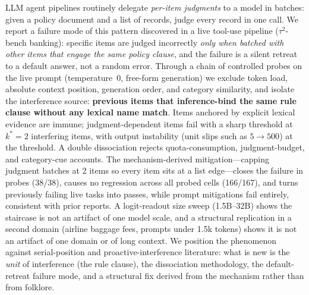 LLM agent pipelines routinely delegate \emph{per-item judgments} to a model in batches: given a policy document
and a list of records, judge every record in one call. We report a failure mode of this pattern discovered in a
live tool-use pipeline ($\tau^2$-bench banking): specific items are judged incorrectly \emph{only when batched
with other items that engage the same policy clause}, and the failure is a silent retreat to a default answer,
not a random error. Through a chain of controlled probes on the live prompt (temperature~0, free-form
generation) we exclude token load, absolute context position, generation order, and category similarity, and
isolate the interference source: \textbf{previous items that inference-bind the same rule clause without any
lexical name match}. Items anchored by explicit lexical evidence are immune; judgment-dependent items fail with
a sharp threshold at $k^\ast{=}2$ interfering items, with output instability (unit slips such as
$5 \rightarrow 500$) at the threshold. A double dissociation rejects quota-consumption, judgment-budget, and
category-cue accounts. The mechanism-derived mitigation---capping judgment batches at 2 items so every item
sits at a list edge---closes the failure in probes (38/38), causes no regression across all probed cells
(166/167), and turns previously failing live tasks into passes, while prompt mitigations fail entirely,
consistent with prior reports. A logit-readout size sweep (1.5B--32B) shows the staircase is not an artifact of
one model scale, and a structural replication in a second domain (airline baggage fees, prompts under 1.5k
tokens) shows it is not an artifact of one domain or of long context. We position the phenomenon against
serial-position and proactive-interference literature: what is new is the \emph{unit} of interference (the rule
clause), the dissociation methodology, the default-retreat failure mode, and a structural fix derived from the
mechanism rather than from folklore.
